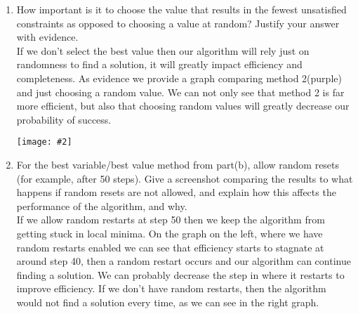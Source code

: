 \documentclass{article}
\def\ans#1{{\color{ans}#1}}
\newcommand{\centerfig}[2]{\begin{center}\texttt{[image: \#2]}\end{center}}
\begin{document}
\begin{enumerate}[label=(\alph*)]
{>>>>>>> b4af745f5cf37a0a9c9eb81c2f529b246c2270b1
        this is probably because even though we choose a random node, we are always choosing the value 
        that will try to satisfy the maximum amount of constraints.
    }
    \begin{center}
        \begin{figure}[htp]
        \begin{subfigure}[b]{0.5\textwidth} \color{ans}
            \centerfig{1}{../figs/q4_c_1.png}
        \end{subfigure}
        \begin{subfigure}[b]{0.5\textwidth} \color{ans}
            \centerfig{1}{../figs/q4_c_2.png}
        \end{subfigure}
        \end{figure}
    \end{center}
    \item How important is it to choose the value that results in the fewest unsatisfied constraints as opposed to choosing a value at random? Justify your answer with evidence.\\
    \ans{
        If we don’t select the best value then our algorithm will rely just on randomness to find a 
        solution, it will greatly impact efficiency and completeness. As evidence we provide a graph 
        comparing method 2(purple) and just choosing a random value. We can not only see that method 2 
        is far more efficient, but also that choosing random values will greatly decrease our probability 
        of success.
    }
    \centerfig{0.8}{../figs/q4_c_3.png}
    \item For the best variable/best value method from part(b), allow random resets (for example, after 50 steps). Give a screenshot comparing the results to what happens if random resets are not allowed, and explain how this affects the performance of the algorithm, and why.\\
    \ans{
        If we allow random restarts at step 50 then we keep the algorithm from getting stuck in local minima. 
        On the graph on the left, where we have random restarts enabled we can see that efficiency starts 
        to stagnate at around step 40, then a random restart occurs and our algorithm can continue 
        finding a solution. We can probably decrease the step in where it restarts to improve efficiency. 
        If we don’t have random restarts, then the algorithm would not find a solution every time, as we 
        can see in the right graph.
    }
    \begin{center}

\end{center}
\end{enumerate}
\end{document}

